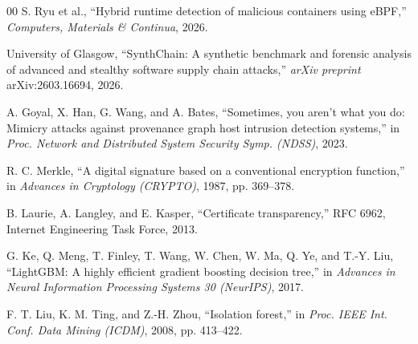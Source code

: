 \documentclass[conference]{IEEEtran}
\begin{document}
\begin{thebibliography}{00}
 S. Ryu et al., ``Hybrid runtime detection of
malicious containers using eBPF,'' \textit{Computers, Materials \&
Continua}, 2026.


 University of Glasgow, ``SynthChain: A
synthetic benchmark and forensic analysis of advanced and stealthy
software supply chain attacks,'' \textit{arXiv preprint}
arXiv:2603.16694, 2026.

 A. Goyal, X. Han, G. Wang, and A. Bates,
``Sometimes, you aren't what you do: Mimicry attacks against provenance
graph host intrusion detection systems,'' in \textit{Proc. Network and
Distributed System Security Symp. (NDSS)}, 2023.


 R. C. Merkle, ``A digital signature based on a
conventional encryption function,'' in \textit{Advances in Cryptology
(CRYPTO)}, 1987, pp. 369--378.

 B. Laurie, A. Langley, and E. Kasper, ``Certificate
transparency,'' RFC 6962, Internet Engineering Task Force, 2013.


 G. Ke, Q. Meng, T. Finley, T. Wang, W. Chen,
W. Ma, Q. Ye, and T.-Y. Liu, ``LightGBM: A highly efficient gradient
boosting decision tree,'' in \textit{Advances in Neural Information
Processing Systems 30 (NeurIPS)}, 2017.

 F. T. Liu, K. M. Ting, and Z.-H. Zhou,
``Isolation forest,'' in \textit{Proc. IEEE Int. Conf. Data Mining
(ICDM)}, 2008, pp. 413--422.

\end{thebibliography}
\end{document}
